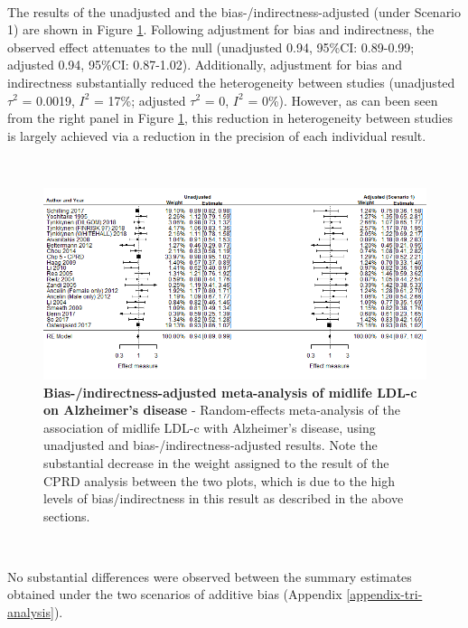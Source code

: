 \documentclass[a4paper, twoside]{templates/ociamthesis}
\begin{document}
~

The results of the unadjusted and the bias-/indirectness-adjusted (under Scenario 1) are shown in Figure \ref{fig:fpLdlAd}. Following adjustment for bias and indirectness, the observed effect attenuates to the null (unadjusted 0.94, 95\%CI: 0.89-0.99; adjusted 0.94, 95\%CI: 0.87-1.02). Additionally, adjustment for bias and indirectness substantially reduced the heterogeneity between studies (unadjusted \(\tau^2\) = 0.0019, \(I^2\) = 17\%; adjusted \(\tau^2\) = 0, \(I^2\) = 0\%). However, as can been seen from the right panel in Figure \ref{fig:fpLdlAd}, this reduction in heterogeneity between studies is largely achieved via a reduction in the precision of each individual result.

~





\begin{figure}[H]
\includegraphics[width=1\linewidth]{figures/tri/fp_paired_midlife_ldl_ad} \caption[Bias-/indirectness-adjusted meta-analysis of midlife LDL-c on Alzheimer's disease]{\textbf{Bias-/indirectness-adjusted meta-analysis of midlife LDL-c on Alzheimer's disease} - Random-effects meta-analysis of the association of midlife LDL-c with Alzheimer's disease, using unadjusted and bias-/indirectness-adjusted results. Note the substantial decrease in the weight assigned to the result of the CPRD analysis between the two plots, which is due to the high levels of bias/indirectness in this result as described in the above sections.}\label{fig:fpLdlAd}
\end{figure}

~

No substantial differences were observed between the summary estimates obtained under the two scenarios of additive bias (Appendix \ref{appendix-tri-analysis}).

~
\end{document}
